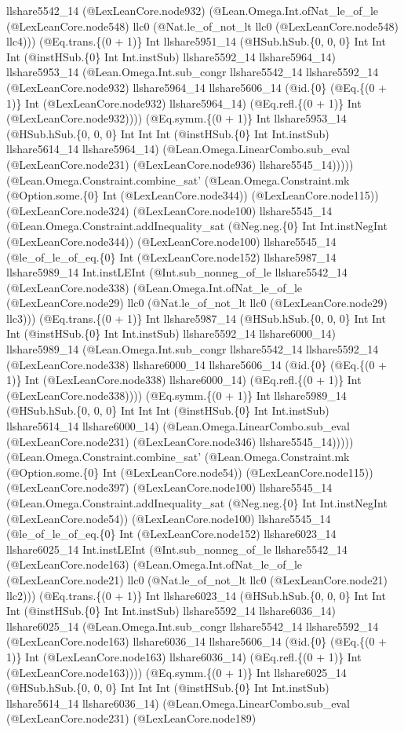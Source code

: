\documentclass[11pt]{article}
\begin{document}
llshare5542\_14 (@LexLeanCore.node932) (@Lean.Omega.Int.ofNat\_le\_of\_le (@LexLeanCore.node548) llc0 (@Nat.le\_of\_not\_lt llc0 (@LexLeanCore.node548) llc4))) (@Eq.trans.\{(0 + 1)\} Int llshare5951\_14 (@HSub.hSub.\{0, 0, 0\} Int Int Int (@instHSub.\{0\} Int Int.instSub) llshare5592\_14 llshare5964\_14) llshare5953\_14 (@Lean.Omega.Int.sub\_congr llshare5542\_14 llshare5592\_14 (@LexLeanCore.node932) llshare5964\_14 llshare5606\_14 (@id.\{0\} (@Eq.\{(0 + 1)\} Int (@LexLeanCore.node932) llshare5964\_14) (@Eq.refl.\{(0 + 1)\} Int (@LexLeanCore.node932)))) (@Eq.symm.\{(0 + 1)\} Int llshare5953\_14 (@HSub.hSub.\{0, 0, 0\} Int Int Int (@instHSub.\{0\} Int Int.instSub) llshare5614\_14 llshare5964\_14) (@Lean.Omega.LinearCombo.sub\_eval (@LexLeanCore.node231) (@LexLeanCore.node936) llshare5545\_14))))) (@Lean.Omega.Constraint.combine\_sat' (@Lean.Omega.Constraint.mk (@Option.some.\{0\} Int (@LexLeanCore.node344)) (@LexLeanCore.node115)) (@LexLeanCore.node324) (@LexLeanCore.node100) llshare5545\_14 (@Lean.Omega.Constraint.addInequality\_sat (@Neg.neg.\{0\} Int Int.instNegInt (@LexLeanCore.node344)) (@LexLeanCore.node100) llshare5545\_14 (@le\_of\_le\_of\_eq.\{0\} Int (@LexLeanCore.node152) llshare5987\_14 llshare5989\_14 Int.instLEInt (@Int.sub\_nonneg\_of\_le llshare5542\_14 (@LexLeanCore.node338) (@Lean.Omega.Int.ofNat\_le\_of\_le (@LexLeanCore.node29) llc0 (@Nat.le\_of\_not\_lt llc0 (@LexLeanCore.node29) llc3))) (@Eq.trans.\{(0 + 1)\} Int llshare5987\_14 (@HSub.hSub.\{0, 0, 0\} Int Int Int (@instHSub.\{0\} Int Int.instSub) llshare5592\_14 llshare6000\_14) llshare5989\_14 (@Lean.Omega.Int.sub\_congr llshare5542\_14 llshare5592\_14 (@LexLeanCore.node338) llshare6000\_14 llshare5606\_14 (@id.\{0\} (@Eq.\{(0 + 1)\} Int (@LexLeanCore.node338) llshare6000\_14) (@Eq.refl.\{(0 + 1)\} Int (@LexLeanCore.node338)))) (@Eq.symm.\{(0 + 1)\} Int llshare5989\_14 (@HSub.hSub.\{0, 0, 0\} Int Int Int (@instHSub.\{0\} Int Int.instSub) llshare5614\_14 llshare6000\_14) (@Lean.Omega.LinearCombo.sub\_eval (@LexLeanCore.node231) (@LexLeanCore.node346) llshare5545\_14))))) (@Lean.Omega.Constraint.combine\_sat' (@Lean.Omega.Constraint.mk (@Option.some.\{0\} Int (@LexLeanCore.node54)) (@LexLeanCore.node115)) (@LexLeanCore.node397) (@LexLeanCore.node100) llshare5545\_14 (@Lean.Omega.Constraint.addInequality\_sat (@Neg.neg.\{0\} Int Int.instNegInt (@LexLeanCore.node54)) (@LexLeanCore.node100) llshare5545\_14 (@le\_of\_le\_of\_eq.\{0\} Int (@LexLeanCore.node152) llshare6023\_14 llshare6025\_14 Int.instLEInt (@Int.sub\_nonneg\_of\_le llshare5542\_14 (@LexLeanCore.node163) (@Lean.Omega.Int.ofNat\_le\_of\_le (@LexLeanCore.node21) llc0 (@Nat.le\_of\_not\_lt llc0 (@LexLeanCore.node21) llc2))) (@Eq.trans.\{(0 + 1)\} Int llshare6023\_14 (@HSub.hSub.\{0, 0, 0\} Int Int Int (@instHSub.\{0\} Int Int.instSub) llshare5592\_14 llshare6036\_14) llshare6025\_14 (@Lean.Omega.Int.sub\_congr llshare5542\_14 llshare5592\_14 (@LexLeanCore.node163) llshare6036\_14 llshare5606\_14 (@id.\{0\} (@Eq.\{(0 + 1)\} Int (@LexLeanCore.node163) llshare6036\_14) (@Eq.refl.\{(0 + 1)\} Int (@LexLeanCore.node163)))) (@Eq.symm.\{(0 + 1)\} Int llshare6025\_14 (@HSub.hSub.\{0, 0, 0\} Int Int Int (@instHSub.\{0\} Int Int.instSub) llshare5614\_14 llshare6036\_14) (@Lean.Omega.LinearCombo.sub\_eval (@LexLeanCore.node231) (@LexLeanCore.node189) 
\end{document}
